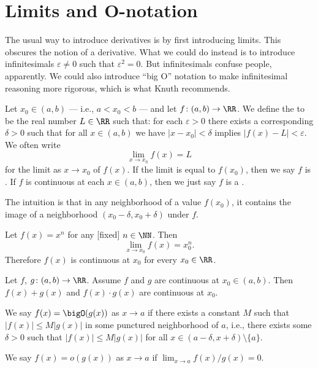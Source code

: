 \section{Limits and O-notation}

\begin{node}\label{calculus-0002}%
The usual way to introduce derivatives is by first introducing
limits. This obscures the notion of a derivative. What we could do
instead is to introduce infinitesimals $\varepsilon\neq0$ such that
$\varepsilon^{2}=0$. But infinitesimals confuse people, apparently.
We could also introduce ``big O'' notation to make infinitesimal
reasoning more rigorous, which is what Knuth recommends.
\end{node}

\begin{definition}\label{calculus-0018}%
Let $x_{0}\in(a,b)$ --- i.e., $a<x_{0}<b$ --- and let
$f\colon(a,b)\to\RR$. We define the 
to be the real number $L\in\RR$ such that: for each $\varepsilon>0$
there exists a corresponding $\delta>0$ such that for all $x\in(a,b)$ we
have $|x-x_{0}|<\delta$ implies $|f(x)-L|<\varepsilon$. We often write
\[\lim_{x\to x_{0}}f(x)=L\]
for the limit as $x\to x_{0}$ of $f(x)$. If the limit is equal to
$f(x_{0})$, then we say $f$ is . If $f$ is
continuous at each $x\in(a,b)$, then we just say $f$ is a
.

The intuition is that in any neighborhood of a value $f(x_{0})$, it
contains the image of a neighborhood $(x_{0}-\delta,x_{0}+\delta)$ under
$f$. 

\begin{example}\label{calculus-0019}%
Let $f(x)=x^{n}$ for any [fixed] $n\in\NN$. Then
\[\lim_{x\to x_{0}}f(x)=x_{0}^{n}.\]
Therefore $f(x)$ is continuous at $x_{0}$ for every $x_{0}\in\RR$.
\end{example}

\begin{theorem}
Let $f$, $g\colon(a,b)\to\RR$. Assume $f$ and $g$ are continuous at
$x_{0}\in(a,b)$. Then $f(x)+g(x)$ and $f(x)\cdot g(x)$ are continuous at
$x_{0}$.
\end{theorem}
\end{definition}

\begin{definition}\label{calculus-0001}%
We say $f(x)=\bigO(g(x))$ as $x\to a$ if there exists a constant $M$
such that $|f(x)|\leq M|g(x)|$ in some punctured neighborhood of $a$,
i.e., there exists some $\delta>0$ such that $|f(x)|\leq M|g(x)|$ for all $x\in(a-\delta,x+\delta)\setminus\{a\}$.

We say $f(x)=o(g(x))$ as $x\to a$ if $\lim_{x\to a}f(x)/g(x)=0$.
\end{definition}

